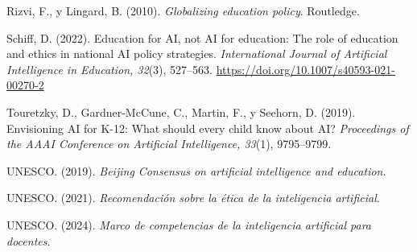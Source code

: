 \documentclass[12pt,letterpaper]{article}
\begin{document}
\begin{sloppypar}
Rizvi, F., y Lingard, B. (2010). \textit{Globalizing education policy}. Routledge.

Schiff, D. (2022). Education for AI, not AI for education: The role of education and ethics in
national AI policy strategies. \textit{International Journal of Artificial Intelligence in
Education, 32}(3), 527--563. \url{https://doi.org/10.1007/s40593-021-00270-2}

Touretzky, D., Gardner-McCune, C., Martin, F., y Seehorn, D. (2019). Envisioning AI for K-12:
What should every child know about AI? \textit{Proceedings of the AAAI Conference on Artificial
Intelligence, 33}(1), 9795--9799.

UNESCO. (2019). \textit{Beijing Consensus on artificial intelligence and education}.

UNESCO. (2021). \textit{Recomendación sobre la ética de la inteligencia artificial}.

UNESCO. (2024). \textit{Marco de competencias de la inteligencia artificial para docentes}.

\end{sloppypar}
\end{document}
